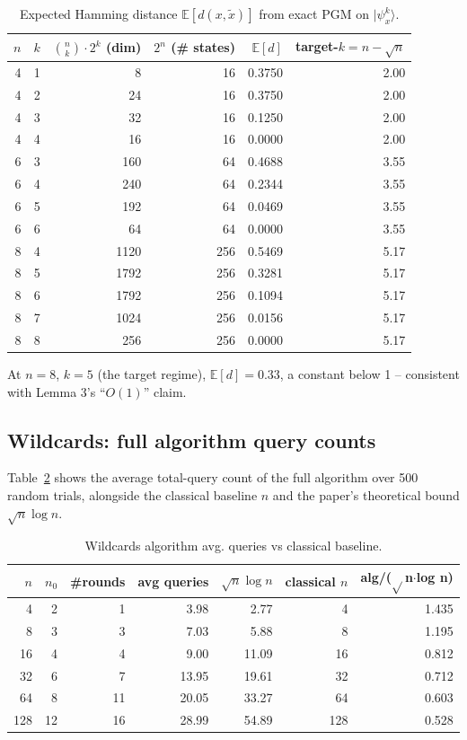 \documentclass[11pt]{article}
\begin{document}
\begin{table}[h]\centering
\caption{Expected Hamming distance $\mathbb{E}[d(x,\tilde x)]$ from
exact PGM on $|\psi_x^k\rangle$.}
\label{tab:lemma3}
\begin{tabular}{@{}rrrrrr@{}}
\toprule
$n$ & $k$ & $\binom{n}{k}\cdot 2^k$ (dim) & $2^n$ (\# states) & $\mathbb{E}[d]$ & target-$k = n-\sqrt n$\\
\midrule
4 & 1 & 8   & 16  & 0.3750 & 2.00\\
4 & 2 & 24  & 16  & 0.3750 & 2.00\\
4 & 3 & 32  & 16  & 0.1250 & 2.00\\
4 & 4 & 16  & 16  & 0.0000 & 2.00\\
6 & 3 & 160 & 64  & 0.4688 & 3.55\\
6 & 4 & 240 & 64  & 0.2344 & 3.55\\
6 & 5 & 192 & 64  & 0.0469 & 3.55\\
6 & 6 & 64  & 64  & 0.0000 & 3.55\\
8 & 4 & 1120 & 256 & 0.5469 & 5.17\\
8 & 5 & 1792 & 256 & 0.3281 & 5.17\\
8 & 6 & 1792 & 256 & 0.1094 & 5.17\\
8 & 7 & 1024 & 256 & 0.0156 & 5.17\\
8 & 8 & 256  & 256 & 0.0000 & 5.17\\
\bottomrule
\end{tabular}
\end{table}

At $n=8$, $k=5$ (the target regime), $\mathbb{E}[d]=0.33$, a constant
below 1 -- consistent with Lemma 3's ``$O(1)$'' claim.

\subsection{Wildcards: full algorithm query counts}

Table~\ref{tab:wc-alg} shows the average total-query count of the full
algorithm over 500 random trials, alongside the classical baseline $n$
and the paper's theoretical bound $\sqrt n\log n$.

\begin{table}[h]\centering
\caption{Wildcards algorithm avg. queries vs classical baseline.}
\label{tab:wc-alg}
\begin{tabular}{@{}rrrrrrr@{}}
\toprule
$n$ & $n_0$ & \#rounds & avg queries & $\sqrt n\log n$ & classical $n$ & alg/($\sqrt{}$n$\cdot$log n) \\
\midrule
4   & 2  & 1  &  3.98 &  2.77 &   4 & 1.435 \\
8   & 3  & 3  &  7.03 &  5.88 &   8 & 1.195 \\
16  & 4  & 4  &  9.00 & 11.09 &  16 & 0.812 \\
32  & 6  & 7  & 13.95 & 19.61 &  32 & 0.712 \\
64  & 8  & 11 & 20.05 & 33.27 &  64 & 0.603 \\
128 & 12 & 16 & 28.99 & 54.89 & 128 & 0.528 \\
\bottomrule
\end{tabular}
\end{table}
\end{document}
